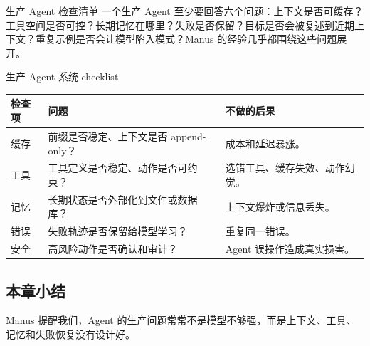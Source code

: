\begin{importantbox}{生产 Agent 检查清单}
一个生产 Agent 至少要回答六个问题：上下文是否可缓存？工具空间是否可控？长期记忆在哪里？失败是否保留？目标是否会被复述到近期上下文？重复示例是否会让模型陷入模式？Manus 的经验几乎都围绕这些问题展开。
\end{importantbox}

\begin{knowledgebox}{生产 Agent 系统 checklist}
\begin{tabularx}{\textwidth}{p{}p{}X}
\toprule
检查项 & 问题 & 不做的后果 \\
\midrule
缓存 & 前缀是否稳定、上下文是否 append-only？ & 成本和延迟暴涨。 \\
工具 & 工具定义是否稳定、动作是否可约束？ & 选错工具、缓存失效、动作幻觉。 \\
记忆 & 长期状态是否外部化到文件或数据库？ & 上下文爆炸或信息丢失。 \\
错误 & 失败轨迹是否保留给模型学习？ & 重复同一错误。 \\
安全 & 高风险动作是否确认和审计？ & Agent 误操作造成真实损害。 \\
\bottomrule
\end{tabularx}
\end{knowledgebox}

\subsection{本章小结}

Manus 提醒我们，Agent 的生产问题常常不是模型不够强，而是上下文、工具、记忆和失败恢复没有设计好。

